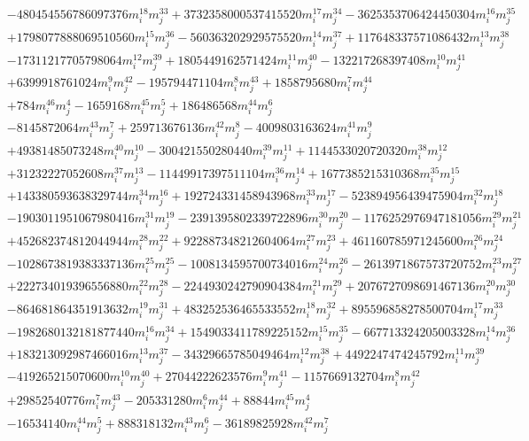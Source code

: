 {\begin{align*}
&-480454556786097376m_i^{18}m_j^{33}+3732358000537415520m_i^{17}m_j^{34}-3625353706424450304m_i^{16}m_j^{35}\\
&+1798077888069510560m_i^{15}m_j^{36}-560363202929575520m_i^{14}m_j^{37}+117648337571086432m_i^{13}m_j^{38}\\
&-17311217705798064m_i^{12}m_j^{39}+1805449162571424m_i^{11}m_j^{40}-132217268397408m_i^{10}m_j^{41}\\
&+6399918761024m_i^{9}m_j^{42}-195794471104m_i^{8}m_j^{43}+1858795680m_i^{7}m_j^{44}\\
&+784m_i^{46}m_j^{4}-1659168m_i^{45}m_j^{5}+186486568m_i^{44}m_j^{6}\\
&-8145872064m_i^{43}m_j^{7}+259713676136m_i^{42}m_j^{8}-4009803163624m_i^{41}m_j^{9}\\
&+49381485073248m_i^{40}m_j^{10}-300421550280440m_i^{39}m_j^{11}+1144533020720320m_i^{38}m_j^{12}\\
&+31232227052608m_i^{37}m_j^{13}-11449917397511104m_i^{36}m_j^{14}+1677385215310368m_i^{35}m_j^{15}\\
&+143380593638329744m_i^{34}m_j^{16}+192724331458943968m_i^{33}m_j^{17}-523894956439475904m_i^{32}m_j^{18}\\
&-1903011951067980416m_i^{31}m_j^{19}-2391395802339722896m_i^{30}m_j^{20}-1176252976947181056m_i^{29}m_j^{21}\\
&+452682374812044944m_i^{28}m_j^{22}+922887348212604064m_i^{27}m_j^{23}+461160785971245600m_i^{26}m_j^{24}\\
&-1028673819383337136m_i^{25}m_j^{25}-1008134595700734016m_i^{24}m_j^{26}-2613971867573720752m_i^{23}m_j^{27}\\
&+222734019396556880m_i^{22}m_j^{28}-2244930242790904384m_i^{21}m_j^{29}+2076727098691467136m_i^{20}m_j^{30}\\
&-864681864351913632m_i^{19}m_j^{31}+483252536465533552m_i^{18}m_j^{32}+895596858278500704m_i^{17}m_j^{33}\\
&-1982680132181877440m_i^{16}m_j^{34}+1549033411789225152m_i^{15}m_j^{35}-667713324205003328m_i^{14}m_j^{36}\\
&+183213092987466016m_i^{13}m_j^{37}-34329665785049464m_i^{12}m_j^{38}+4492247474245792m_i^{11}m_j^{39}\\
&-419265215070600m_i^{10}m_j^{40}+27044222623576m_i^{9}m_j^{41}-1157669132704m_i^{8}m_j^{42}\\
&+29852540776m_i^{7}m_j^{43}-205331280m_i^{6}m_j^{44}+88844m_i^{45}m_j^{4}\\
&-16534140m_i^{44}m_j^{5}+888318132m_i^{43}m_j^{6}-36189825928m_i^{42}m_j^{7}\\

\end{align*}}
